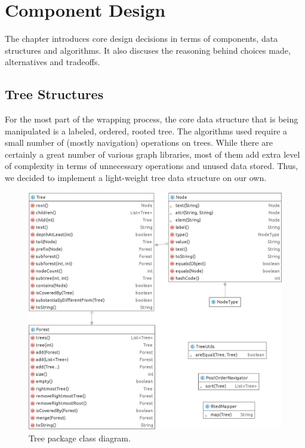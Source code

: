 \chapter{Component Design}
\label{ch:implementation}


The chapter introduces core design decisions in terms of components, data structures and algorithms. It also discuses the reasoning behind choices made, alternatives and tradeoffs.


\section{Tree Structures}

For the most part of the wrapping process, the core data structure that is being manipulated is a labeled, ordered, rooted tree. The algorithms used require a small number of (mostly navigation) operations on trees. While there are certainly a great number of various graph libraries, most of them add extra level of complexity in terms of unnecessary operations and unused data stored. Thus, we decided to implement a light-weight tree data structure on our own.

\begin{figure}[h]
	\centering
	\includegraphics[width=1.0\textwidth]{figures/package-tree}
	\caption{Tree package class diagram.}
	\label{fig:package-tree}
\end{figure}

